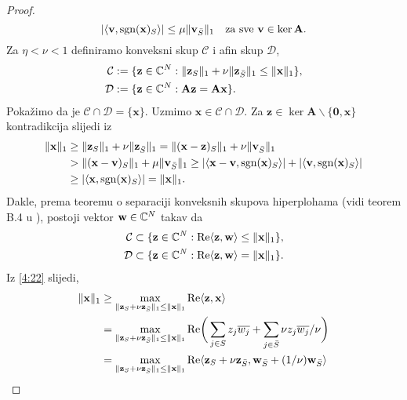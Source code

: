 \documentclass[a4paper,twoside,12pt]{memoir} %
\newcommand{\vect}[1]{\mathbf{#1}}
\renewcommand{\vec}{\vect}
\newcommand{\norm}[1]{\|{#1}\|}
\newcommand{\sgn}{\text{\normalfont{sgn}}}
\renewcommand{\Re}{\text{\normalfont{Re}}}
\begin{document}
\begin{proof}
\begin{equation*}
        |\langle \vec v, \sgn(\vec x)_S \rangle|  \leq \mu\norm{\vec v_{\bar S}}_1 \quad \text{za sve } \vec v \in \ker \vec A.
    \end{equation*}
    Za $\eta < \nu < 1$ definiramo konveksni skup $\mathcal{C}$ i afin skup $\mathcal{D}$,
    \begin{align*}
        \mathcal{C} &:= \{ \vec z \in \C^N : \norm{\vec z_S}_1 + \nu \norm{\vec z_{\bar S}}_1 \leq \norm{\vec x}_1 \},\\
        \mathcal{D} &:= \{ \vec z \in \C^N : \vec{Az} = \vec{Ax} \}.
    \end{align*}
    Poka\v{z}imo da je $\mathcal{C} \cap \mathcal{D} = \{\vec x\}$. Uzmimo $\vec x \in \mathcal{C} \cap \mathcal{D}$. Za $ \vec z \in \ker \vec A \backslash \{\vec 0, \vec x  \}$ kontradikcija slijedi iz
    \begin{align*}
        \norm{\vec x}_1 &\geq \norm{\vec z_S}_1 + \nu \norm{\vec z_{\bar S}}_1 = \norm{(\vec x - \vec z)_S}_1 + \nu \norm{\vec v_{\bar S}}_1\\
        &> \norm{(\vec x - \vec v)_S}_1 + \mu \norm{\vec v_{\bar S}}_1 \geq |\langle \vec x - \vec v, \sgn(\vec x)_S \rangle| + |\langle \vec v, \sgn(\vec x)_S \rangle|\\
        &\geq |\langle \vec x, \sgn(\vec x)_S \rangle| = \norm{\vec x}_1.
    \end{align*}
    Dakle, prema teoremu o separaciji konveksnih skupova hiperplohama (vidi teorem B.4 u \cite{foucart13}), postoji vektor $\vec w \in \C^N$ takav da
    \begin{align}
        \mathcal{C} \subset \{ \vec z \in \C^N: \Re \langle \vec z, \vec w \rangle \leq \norm{\vec x}_1 \}\label{4:22},\\
        \mathcal{D} \subset \{ \vec z \in \C^N: \Re \langle \vec z, \vec w \rangle = \norm{\vec x}_1 \}\label{4:23}.
    \end{align}
    Iz \eqref{4:22} slijedi, 
    \begin{align*}
        \norm{\vec x}_1 &\geq \max_{\norm{\vec z_S + \nu \vec z_{\bar S}}_1 \leq \norm{\vec x}_1} \Re \langle \vec z, \vec x\rangle \\
        &=\max_{\norm{\vec z_S + \nu \vec z_{\bar S}}_1 \leq \norm{\vec x}_1} \Re \bigg( \sum_{j \in S} z_j \overline{w_j} + \sum_{j \in \bar S} \nu z_j \overline{w_j}/ \nu \bigg)\\
        &= \max_{\norm{\vec z_S + \nu \vec z_{\bar S}}_1 \leq \norm{\vec x}_1} \Re \langle \vec z_S + \nu \vec z_{\bar S}, \vec w_{\bar S} + (1/\nu) \vec w_{\bar S} \rangle \\

\end{align*}
\end{proof}
\end{document}
